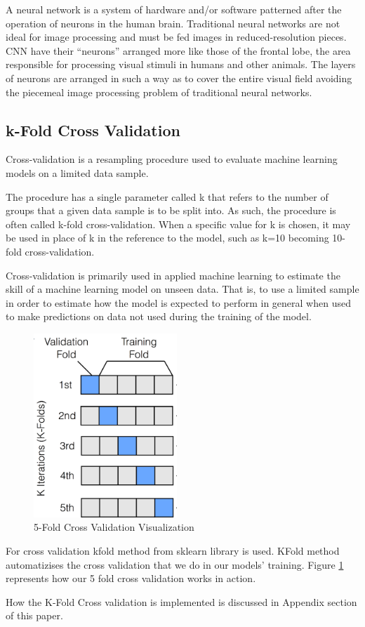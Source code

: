 A neural network is a system of hardware and/or software patterned after the operation of neurons in the human brain. Traditional neural networks are not ideal for image processing and must be fed images in reduced-resolution pieces. CNN have their “neurons” arranged more like those of the frontal lobe, the area responsible for processing visual stimuli in humans and other animals. The layers of neurons are arranged in such a way as to cover the entire visual field avoiding the piecemeal image processing problem of traditional neural networks.\par

 \subsection{k-Fold Cross Validation}
 Cross-validation is a resampling procedure used to evaluate machine learning models on a limited data sample. \par

The procedure has a single parameter called k that refers to the number of groups that a given data sample is to be split into. As such, the procedure is often called k-fold cross-validation. When a specific value for k is chosen, it may be used in place of k in the reference to the model, such as k=10 becoming 10-fold cross-validation.\par

Cross-validation is primarily used in applied machine learning to estimate the skill of a machine learning model on unseen data. That is, to use a limited sample in order to estimate how the model is expected to perform in general when used to make predictions on data not used during the training of the model.\par
\begin{figure}
    \centering
    \includegraphics[width=0.48\textwidth]{Images/cross_validation.png}
    \caption{5-Fold Cross Validation Visualization}
    \label{fig:cross_validation}
\end{figure}
For cross validation kfold method from sklearn library is used. KFold method automatizises the cross validation that we do in our models' training. Figure  \cref{fig:cross_validation} represents how our 5 fold cross validation works in action. \par
How the K-Fold Cross validation is implemented is discussed in Appendix section of this paper.\par
